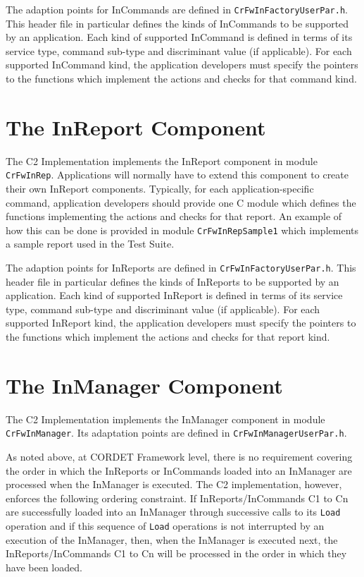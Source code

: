 \documentclass[a4paper,10pt]{article}
\let\stdsection\section
\renewcommand\section{\newpage\stdsection}
\begin{document}
The adaption points for InCommands are defined in \texttt{CrFwInFactoryUserPar.h}. This header file in particular defines the kinds of InCommands to be supported by an application. Each kind of supported InCommand is defined in terms of its service type, command sub-type and discriminant value (if applicable). For each supported InCommand kind, the application developers must specify the pointers to the functions which implement the actions and checks for that command kind.


\section{The InReport Component}\label{sec:InReport}


The C2 Implementation implements the InReport component in module \texttt{CrFwInRep}. Applications will normally have to extend this component to create their own InReport components. Typically, for each application-specific command, application developers should provide one C module which defines the functions implementing the actions and checks for that report. An example of how this can be done is provided in module \texttt{CrFwInRepSample1} which implements a sample report used in the Test Suite.

The adaption points for InReports are defined in \texttt{CrFwInFactoryUserPar.h}. This header file in particular defines the kinds of InReports to be supported by an application. Each kind of supported InReport is defined in terms of its service type, command sub-type and discriminant value (if applicable). For each supported InReport kind, the application developers must specify the pointers to the functions which implement the actions and checks for that report kind.


\section{The InManager Component}\label{sec:InManager}


The C2 Implementation implements the InManager component in module \texttt{CrFwInManager}. Its adaptation points are defined in \texttt{CrFwInManagerUserPar.h}.

As noted above, at CORDET Framework level, there is no requirement covering the order in which the InReports or InCommands loaded into an InManager are processed when the InManager is executed. The C2 implementation, however, enforces the following ordering constraint. If InReports/InCommands C1 to Cn are successfully loaded into an InManager through successive calls to its \texttt{Load} operation and if this sequence of \texttt{Load} operations is not interrupted by an execution of the InManager, then, when the InManager is executed next, the InReports/InCommands C1 to Cn will be processed in the order in which they have been loaded.
\end{document}
